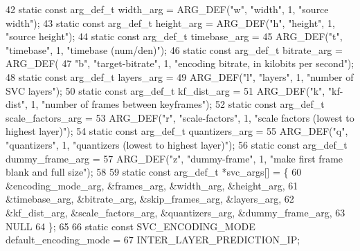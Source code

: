 \begin{DoxyCodeInclude}
42 \textcolor{keyword}{static} \textcolor{keyword}{const} arg\_def\_t width\_arg = ARG\_DEF(\textcolor{stringliteral}{"w"}, \textcolor{stringliteral}{"width"}, 1, \textcolor{stringliteral}{"source width"});
43 \textcolor{keyword}{static} \textcolor{keyword}{const} arg\_def\_t height\_arg = ARG\_DEF(\textcolor{stringliteral}{"h"}, \textcolor{stringliteral}{"height"}, 1, \textcolor{stringliteral}{"source height"});
44 \textcolor{keyword}{static} \textcolor{keyword}{const} arg\_def\_t timebase\_arg =
45     ARG\_DEF(\textcolor{stringliteral}{"t"}, \textcolor{stringliteral}{"timebase"}, 1, \textcolor{stringliteral}{"timebase (num/den)"});
46 \textcolor{keyword}{static} \textcolor{keyword}{const} arg\_def\_t bitrate\_arg = ARG\_DEF(
47     \textcolor{stringliteral}{"b"}, \textcolor{stringliteral}{"target-bitrate"}, 1, \textcolor{stringliteral}{"encoding bitrate, in kilobits per second"});
48 \textcolor{keyword}{static} \textcolor{keyword}{const} arg\_def\_t layers\_arg =
49     ARG\_DEF(\textcolor{stringliteral}{"l"}, \textcolor{stringliteral}{"layers"}, 1, \textcolor{stringliteral}{"number of SVC layers"});
50 \textcolor{keyword}{static} \textcolor{keyword}{const} arg\_def\_t kf\_dist\_arg =
51     ARG\_DEF(\textcolor{stringliteral}{"k"}, \textcolor{stringliteral}{"kf-dist"}, 1, \textcolor{stringliteral}{"number of frames between keyframes"});
52 \textcolor{keyword}{static} \textcolor{keyword}{const} arg\_def\_t scale\_factors\_arg =
53     ARG\_DEF(\textcolor{stringliteral}{"r"}, \textcolor{stringliteral}{"scale-factors"}, 1, \textcolor{stringliteral}{"scale factors (lowest to highest layer)"});
54 \textcolor{keyword}{static} \textcolor{keyword}{const} arg\_def\_t quantizers\_arg =
55     ARG\_DEF(\textcolor{stringliteral}{"q"}, \textcolor{stringliteral}{"quantizers"}, 1, \textcolor{stringliteral}{"quantizers (lowest to highest layer)"});
56 \textcolor{keyword}{static} \textcolor{keyword}{const} arg\_def\_t dummy\_frame\_arg =
57     ARG\_DEF(\textcolor{stringliteral}{"z"}, \textcolor{stringliteral}{"dummy-frame"}, 1, \textcolor{stringliteral}{"make first frame blank and full size"});
58 
59 \textcolor{keyword}{static} \textcolor{keyword}{const} arg\_def\_t *svc\_args[] = \{
60   &encoding\_mode\_arg, &frames\_arg,        &width\_arg,       &height\_arg,
61   &timebase\_arg,      &bitrate\_arg,       &skip\_frames\_arg, &layers\_arg,
62   &kf\_dist\_arg,       &scale\_factors\_arg, &quantizers\_arg,  &dummy\_frame\_arg,
63   NULL
64 \};
65 
66 \textcolor{keyword}{static} \textcolor{keyword}{const} SVC\_ENCODING\_MODE default\_encoding\_mode =
67     INTER\_LAYER\_PREDICTION\_IP;

\end{DoxyCodeInclude}
